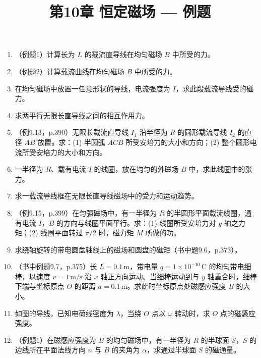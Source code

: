 \documentclass{ctexart}
\title{\textbf{第10章 恒定磁场} --- 例题}
\author{}
\date{}
\begin{document}
\maketitle

\begin{enumerate}

\item（例题1）计算长为 $L$ 的载流直导线在均匀磁场 $B$ 中所受的力。

\item（例题2）计算载流曲线在均匀磁场 $B$ 中所受的力。

\item 在均匀磁场中放置一任意形状的导线，电流强度为 $I$，求此段载流导线受的磁力。

\item 求两平行无限长直导线之间的相互作用力。

\item（例9.13，p.390）无限长载流直导线 $I_1$ 沿半径为 $R$ 的圆形载流导线 $I_2$ 的直径 $AB$ 放置。求：(1) 半圆弧 $ACB$ 所受安培力的大小和方向；(2) 整个圆形电流所受安培力的大小和方向。

\item 一半径为 $R$、载有电流 $I$ 的线圈，放在均匀的外磁场 $B$ 中，求此线圈中的张力。

\item 求一载流导线框在无限长直导线磁场中的受力和运动趋势。

\item（例9.15，p.399）在匀强磁场中，有一半径为 $R$ 的半圆形平面载流线圈，通有电流 $I$，$B$ 的方向与线圈平面平行。求：(1) 线圈所受安培力对 $y$ 轴之力矩；(2) 线圈平面转过 $\pi/2$ 时，磁力矩 $M$ 所做的功。

\item 求绕轴旋转的带电圆盘轴线上的磁场和圆盘的磁矩（书中题9.6，p.373）。

\item（书中例题9.7，p.375）长 $L = 0.1\,\text{m}$，带电量 $q = 1\times10^{-10}\,\text{C}$ 的均匀带电细棒，以速度 $v = 1\,\text{m/s}$ 沿 $x$ 轴正方向运动。当细棒运动到与 $y$ 轴重合时，细棒下端与坐标原点 $O$ 的距离 $a = 0.1\,\text{m}$。求此时坐标原点处磁感应强度 $B$ 的大小。

\item 如图的导线，已知电荷线密度为 $\lambda$，当绕 $O$ 点以 $\omega$ 转动时，求 $O$ 点的磁感应强度。

\item（例题1）在磁感应强度为 $B$ 的均匀磁场中，有一半径为 $R$ 的半球面 $S$，$S$ 的边线所在平面法线方向 $n$ 与 $B$ 的夹角为 $\alpha$，求通过半球面 $S$ 的磁通量。


\end{enumerate}
\end{document}
